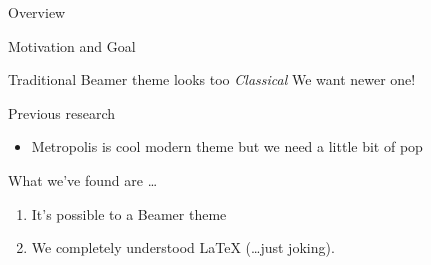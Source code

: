 \begin{frame}{Overview}
  \begin{block}{Motivation and Goal}
    \begin{itemize}
      \ngitem Traditional Beamer theme looks too \emph{Classical}
      \thusitem We want newer one!
    \end{itemize}
  \end{block}
  
  \begin{block}{Previous research}
    \begin{itemize}
    \item Metropolis is cool modern theme but we need a little bit of pop 
    \end{itemize}
  \end{block}
  
  \begin{block}{What we've found are \dots}
    \begin{enumerate}
    \item It's possible to  a Beamer theme 
    \item We completely understood \LaTeX{} (\dots just joking).
    \end{enumerate}
  \end{block}
\end{frame}
